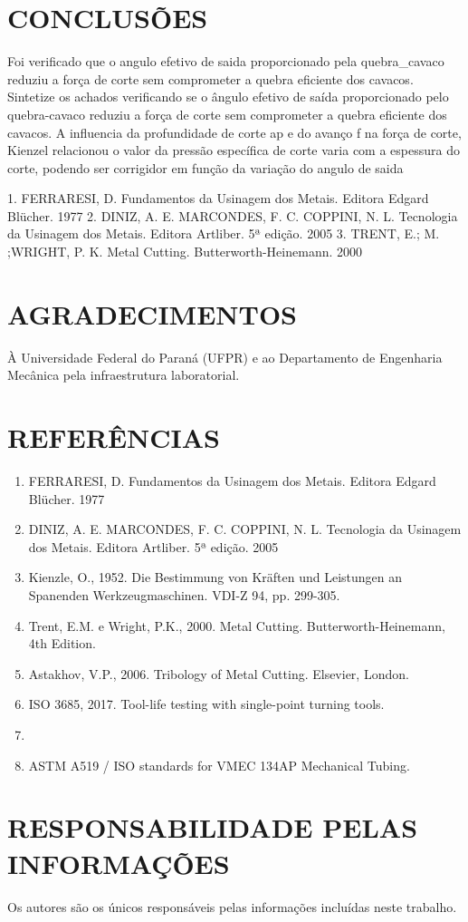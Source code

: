\documentclass[a4paper,10pt]{article}
\begin{document}
\section{CONCLUSÕES}
Foi verificado que o angulo efetivo de saida proporcionado pela quebra_cavaco reduziu a força de corte sem comprometer a quebra eficiente dos cavacos.
Sintetize os achados verificando se o ângulo efetivo de saída proporcionado pelo quebra-cavaco reduziu a força de corte sem comprometer a quebra eficiente dos cavacos.
A influencia da profundidade de corte ap e do avanço f na força de corte, Kienzel relacionou  o valor da pressão específica de corte varia com a espessura do corte, podendo ser corrigidor em função da variação do angulo de saida

1. FERRARESI, D. Fundamentos da Usinagem dos Metais. Editora Edgard Blücher. 1977 
2.  
DINIZ, A. E. MARCONDES, F. C. COPPINI, N. L. Tecnologia da Usinagem dos Metais. 
Editora Artliber. 5ª edição. 2005 
3. TRENT, E.; M. ;WRIGHT, P. K. Metal Cutting. Butterworth-Heinemann. 2000

\section*{AGRADECIMENTOS}
À Universidade Federal do Paraná (UFPR) e ao Departamento de Engenharia Mecânica pela infraestrutura laboratorial.

\section*{REFERÊNCIAS}
\begin{enumerate}\setlength{\itemsep}{0pt}
    
    \item FERRARESI, D. Fundamentos da Usinagem dos Metais. Editora Edgard Blücher. 1977 
    \item DINIZ, A. E. MARCONDES, F. C. COPPINI, N. L. Tecnologia da Usinagem dos Metais. 
            Editora Artliber. 5ª edição. 2005 
    \item Kienzle, O., 1952. Die Bestimmung von Kräften und Leistungen an Spanenden Werkzeugmaschinen. VDI-Z 94, pp. 299-305.
    \item Trent, E.M. e Wright, P.K., 2000. Metal Cutting. Butterworth-Heinemann, 4th Edition.
    \item Astakhov, V.P., 2006. Tribology of Metal Cutting. Elsevier, London.
    \item ISO 3685, 2017. Tool-life testing with single-point turning tools.
    \item \item ASTM A519 / ISO standards for VMEC 134AP Mechanical Tubing.
\end{enumerate}

\section*{RESPONSABILIDADE PELAS INFORMAÇÕES}
Os autores são os únicos responsáveis pelas informações incluídas neste trabalho.
\end{document}
